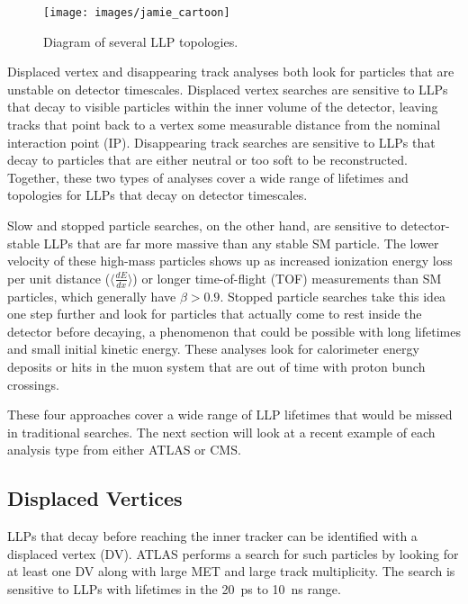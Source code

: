 \documentclass[12pt]{article}
\begin{document}
        \noindent \begin{figure}[htbp] \begin{center}
        \texttt{[image: images/jamie\_cartoon]}
            \caption{Diagram of several LLP topologies.}
        \label{jamie_cartoon}
        \end{center} \end{figure}

        Displaced vertex and disappearing track analyses both look for particles that are unstable on detector timescales. Displaced vertex searches are sensitive to LLPs that decay to visible particles within the inner volume  of the detector, leaving tracks that point back to a vertex some measurable distance from the nominal interaction point (IP). Disappearing track searches are sensitive to LLPs that decay to particles that are either neutral or too soft to be reconstructed. Together, these two types of analyses cover a wide range of lifetimes and topologies for LLPs that decay on detector timescales.

        Slow and stopped particle searches, on the other hand, are sensitive to detector-stable LLPs that are far more massive than any stable SM particle. The lower velocity of these high-mass particles shows up as increased ionization energy loss per unit distance ($\langle\frac{dE}{dx}\rangle$) or longer time-of-flight (TOF) measurements than SM particles, which generally have $\beta > \num{0.9}$. Stopped particle searches take this idea one step further and look for particles that actually come to rest inside the detector before decaying, a phenomenon that could be possible with long lifetimes and small initial kinetic energy. These analyses look for calorimeter energy deposits or hits in the muon system that are out of time with proton bunch crossings.

        These four approaches cover a wide range of LLP lifetimes that would be missed in traditional searches. The next section will look  at a recent example of each analysis type from either ATLAS or CMS.

    \subsection{Displaced Vertices}
        LLPs that decay before reaching the inner tracker can be identified with a displaced vertex (DV). ATLAS performs a search for such particles by looking for at least one DV along with large MET and large track multiplicity. The search is sensitive to LLPs with lifetimes in the \SI{20}{\pico\s} to \SI{10}{\nano\s} range.
\end{document}
